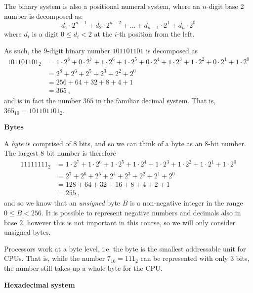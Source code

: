 \documentclass[parskip=half]{scrartcl}
\begin{document}
The binary system is also a positional numeral system, where an $n$-digit base $2$ number is decomposed as:
\[
  d_1 \cdot 2^{n-1} + d_2 \cdot 2^{n-2} + \dots + d_{n-1} \cdot 2^1 + d_n \cdot 2^0
\]
where $d_i$ is a digit $0 \le d_i < 2$ at the $i$-th position from the left.

As such, the $9$-digit binary number $101101101$ is decomposed as
\begin{align*}
  101101101_2 &=
  1 \cdot 2^8 + 0 \cdot 2^7 + 1 \cdot 2^6 + 1 \cdot 2^5 + 0 \cdot 2^4 +
  1 \cdot 2^3 + 1 \cdot 2^2 + 0 \cdot 2^1 + 1 \cdot 2^0\\
  &= 2^8 + 2^6 + 2^5 + 2^3 + 2^2 + 2^0\\
  &= 256 + 64 + 32 + 8 + 4 + 1\\
  &= 365\ ,
\end{align*}
and is in fact the number $365$ in the familiar decimal system.
That is, $365_{10} = 101101101_2$.

\textbf{Bytes}

A \emph{byte} is comprised of $8$ bits, and so we can think of a byte as an $8$-bit number.
The largest $8$ bit number is therefore
\begin{align*}
  11111111_2 &= 1 \cdot 2^7 + 1 \cdot 2^6 + 1 \cdot 2^5 + 1 \cdot 2^4 + 1 \cdot 2^3 + 1\cdot 2^2 + 1\cdot 2^1 + 1 \cdot 2^0\\
  &= 2^7 + 2^6 + 2^5 + 2^4 + 2^3 + 2^2 + 2^1 + 2^0\\
  &= 128 + 64 + 32 + 16 + 8 + 4 + 2 + 1\\
  &= 255\ ,
\end{align*}
and so we know that an \emph{unsigned} byte $B$ is a non-negative integer in the range $0 \le B < 256$.
It is possible to represent negative numbers and decimals\footnotemark{} also in base $2$, however this is not important in this course, so we will only consider unsigned bytes.

Processors work at a byte level, i.e. the byte is the smallest addressable unit for CPUs.
That is, while the number $7_{10} = 111_{2}$ can be represented with only $3$ bits, the number still takes up a whole byte for the CPU.

\textbf{Hexadecimal system}
\end{document}
